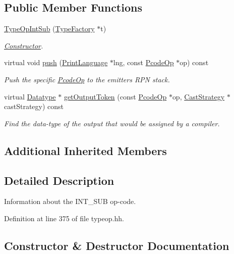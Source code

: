 \subsection*{Public Member Functions}
\begin{DoxyCompactItemize}
\item 
\mbox{\hyperlink{class_type_op_int_sub_a512bc9fe7f2824bbe443635df1bd68d3}{Type\+Op\+Int\+Sub}} (\mbox{\hyperlink{class_type_factory}{Type\+Factory}} $\ast$t)
\begin{DoxyCompactList}\small\item\em \mbox{\hyperlink{class_constructor}{Constructor}}. \end{DoxyCompactList}\item 
virtual void \mbox{\hyperlink{class_type_op_int_sub_a282e230df3a8e7d2a2e540f5cb5d76b1}{push}} (\mbox{\hyperlink{class_print_language}{Print\+Language}} $\ast$lng, const \mbox{\hyperlink{class_pcode_op}{Pcode\+Op}} $\ast$op) const
\begin{DoxyCompactList}\small\item\em Push the specific \mbox{\hyperlink{class_pcode_op}{Pcode\+Op}} to the emitter\textquotesingle{}s R\+PN stack. \end{DoxyCompactList}\item 
virtual \mbox{\hyperlink{class_datatype}{Datatype}} $\ast$ \mbox{\hyperlink{class_type_op_int_sub_a7cba3a83ac6362edcb6d3c8120ac6cd5}{get\+Output\+Token}} (const \mbox{\hyperlink{class_pcode_op}{Pcode\+Op}} $\ast$op, \mbox{\hyperlink{class_cast_strategy}{Cast\+Strategy}} $\ast$cast\+Strategy) const
\begin{DoxyCompactList}\small\item\em Find the data-\/type of the output that would be assigned by a compiler. \end{DoxyCompactList}\end{DoxyCompactItemize}
\subsection*{Additional Inherited Members}


\subsection{Detailed Description}
Information about the I\+N\+T\+\_\+\+S\+UB op-\/code. 

Definition at line 375 of file typeop.\+hh.



\subsection{Constructor \& Destructor Documentation}
\mbox{\label{class_type_op_int_sub_a512bc9fe7f2824bbe443635df1bd68d3}} 
